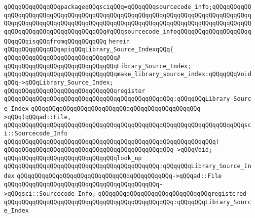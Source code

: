 \verb|qQQqqQQqqQQqqQQqpackageqQQqsciqQQq=qQQqqQQqsourcecode_info;qQQqqQQqqQQqqQQqqQQqqQQqqQQqqQQqqQQqqQQqqQQqqQQqqQQqqQQqqQQqqQQqqQQqqQQqqQQqqQQqqQQqqQQqqQQqqQQqqQQqqQQqqQQqqQQqqQQqqQQqqQQqqQQqqQQqqQQqqQQqqQQqqQQqqQQqqQQqqQQqqQQqqQQqqQQqqQQqqQQq#qQQqsourcecode_infoqQQqqQQqqQQqqQQqqQQqqQQqqQQqisqQQqfromqQQqqQQqqQQq|\newline
\verb|herein|\newline
\newline
\verb|qQQqqQQqqQQqqQQqapiqQQqLibrary_Source_IndexqQQq{|\newline
\verb|qQQqqQQqqQQqqQQqqQQqqQQqqQQqqQQq#|\newline
\verb|qQQqqQQqqQQqqQQqqQQqqQQqqQQqqQQqLibrary_Source_Index;|\newline
\newline
\verb|qQQqqQQqqQQqqQQqqQQqqQQqqQQqqQQqmake_library_source_index:qQQqqQQqVoidqQQq->qQQqLibrary_Source_Index;|\newline
\newline
\verb|qQQqqQQqqQQqqQQqqQQqqQQqqQQqqQQqregister|\newline
\verb|qQQqqQQqqQQqqQQqqQQqqQQqqQQqqQQqqQQqqQQqqQQqqQQq:qQQqqQQqLibrary_Source_Index|\newline
\verb|qQQqqQQqqQQqqQQqqQQqqQQqqQQqqQQqqQQqqQQqqQQqqQQq->qQQq(qQQqad::File,|\newline
\verb|qQQqqQQqqQQqqQQqqQQqqQQqqQQqqQQqqQQqqQQqqQQqqQQqqQQqqQQqqQQqqQQqqQQqsci::Sourcecode_Info|\newline
\verb|qQQqqQQqqQQqqQQqqQQqqQQqqQQqqQQqqQQqqQQqqQQqqQQqqQQqqQQqqQQq)|\newline
\verb|qQQqqQQqqQQqqQQqqQQqqQQqqQQqqQQqqQQqqQQqqQQqqQQq->qQQqVoid;|\newline
\newline
\verb|qQQqqQQqqQQqqQQqqQQqqQQqqQQqqQQqlook_up|\newline
\verb|qQQqqQQqqQQqqQQqqQQqqQQqqQQqqQQqqQQqqQQqqQQq:qQQqqQQqLibrary_Source_Index|\newline
\verb|qQQqqQQqqQQqqQQqqQQqqQQqqQQqqQQqqQQqqQQqqQQq->qQQqad::File|\newline
\verb|qQQqqQQqqQQqqQQqqQQqqQQqqQQqqQQqqQQqqQQqqQQq->qQQqsci::Sourcecode_Info;|\newline
\newline
\verb|qQQqqQQqqQQqqQQqqQQqqQQqqQQqqQQqregistered|\newline
\verb|qQQqqQQqqQQqqQQqqQQqqQQqqQQqqQQqqQQqqQQqqQQqqQQq:qQQqqQQqLibrary_Source_Index|\newline
